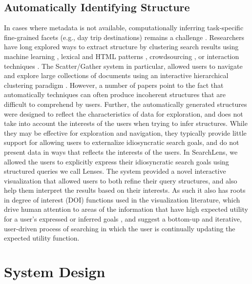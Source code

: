 \documentclass{sigchi}
\begin{document}
\subsection{Automatically Identifying Structure}

In cases where metadata is not available, computationally inferring task-specific fine-grained facets (e.g., day trip destinations) remains a challenge \cite{bruce1999workplace,teevan2008challenges}. Researchers have long explored ways to extract structure by clustering search results using machine learning \cite{zamir1999grouper,zeng2004learning,hearst1996reexamining}, lexical and HTML patterns \cite{kong2014extending}, crowdsourcing \cite{ka,alloy,cascade}, or interaction techniques \cite{hearst1996reexamining,hearst1996visualizing,hearst1996visualizing}.  The Scatter/Gather system in particular, allowed users to navigate and explore large collections of documents using an interactive hierarchical clustering paradigm \cite{hearst1996reexamining}.  However, a number of papers \cite{hearst2006clustering,chuang2012interpretation,alloy} point to the fact that automatically techniques can often produce incoherent structures that are difficult to comprehend by users. Further, the automatically generated structures were designed to reflect the characteristics of data for exploration, and does not take into account the interests of the users when trying to infer structures. While they may be effective for exploration and navigation, they typically provide little support for allowing users to externalize idiosyncratic search goals, and do not present data in ways that reflects the interests of the users. In SearchLens, we allowed the users to explicitly express their idiosyncratic search goals using structured queries we call Lenses. The system provided a novel interactive visualization that allowed users to both refine their query structures, and also help them interpret the results based on their interests. As such it also has roots in degree of interest (DOI) functions used in the visualization literature, which drive human attention to areas of the information that have high expected utility for a user's expressed or inferred goals \cite{Furnas:1986:GFV:22627.22342, van2009search}, and suggest a bottom-up and iterative, user-driven process of searching in which the user is continually updating the expected utility function. 

\section{System Design}
\end{document}
